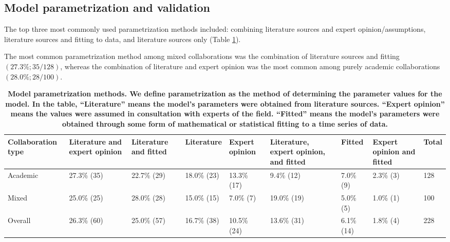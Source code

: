 \documentclass[10pt,letterpaper]{article}
\begin{document}
\subsection*{Model parametrization and validation}
The top three most commonly used parametrization methods included: combining literature sources and expert opinion/assumptions, literature sources and fitting to data, and literature sources only (Table \ref{model_parametrization_results}). 

The most common parametrization method among mixed collaborations was the combination of literature sources and fitting $(27.3 \%; 35/128)$, whereas the combination of literature and expert opinion was the most common among purely academic collaborations $(28.0\%; 28/100)$. 

\begin{table}[!h]
\setlength\arrayrulewidth{1pt} 
\centering
\caption{\bf Model parametrization methods. We define parametrization as the method of determining the parameter values for the model. In the table, ``Literature'' means the model's parameters were obtained from literature sources. ``Expert opinion'' means the values were assumed in consultation with experts of the field. ``Fitted'' means the model’s parameters were obtained through some form of mathematical or statistical fitting to a time series of data. }
\begin{adjustwidth}{-2.10in}{0in}
\begin{tabular}{| p{}  p{}  p{}  p{}  p{}  p{}  p{}  p{}  p{} |} \hline 
\textbf{Collaboration type} & \textbf{Literature and expert opinion} & \textbf{Literature and fitted} & \textbf{Literature} & \textbf{Expert opinion} & \textbf{Literature, expert opinion, and fitted} & \textbf{Fitted} & \textbf{Expert opinion and fitted} & \textbf{Total} \\ \hline
Academic & 27.3\% (35) & 22.7\% (29) & 18.0\% (23) & 13.3\% (17) & 9.4\% (12)  & 7.0\% (9) & 2.3\% (3) & 128 \\ \hline
Mixed & 25.0\% (25) & 28.0\% (28) & 15.0\% (15) & 7.0\% (7) & 19.0\% (19) & 5.0\% (5) & 1.0\% (1) & 100 \\ \hline \rowcolor{gray!20}
Overall & 26.3\% (60) & 25.0\% (57) & 16.7\% (38) & 10.5\% (24) & 13.6\% (31) & 6.1\% (14) & 1.8\% (4) & 228 \\ \hline 
\end{tabular}
\end{adjustwidth}
\label{model_parametrization_results}
\end{table}
\end{document}
